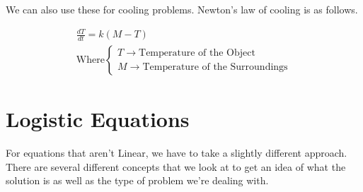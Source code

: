     We can also use these for cooling problems. Newton's law of cooling is as follows.

    \begin{equation}\label{eq:newtoncool}
    \begin{aligned}
    \frac{dT}{dt} = k (M - T)\\
    \text{Where}
    \begin{cases}
    T \to \text{Temperature of the Object}\\
    M \to \text{Temperature of the Surroundings}
    \end{cases}
    \end{aligned}
    \end{equation}


\section{Logistic Equations}
For equations that aren't Linear, we have to take a slightly different approach. There are several different concepts that we look at to get an idea of what the solution is as well as the type of problem we're dealing with.
